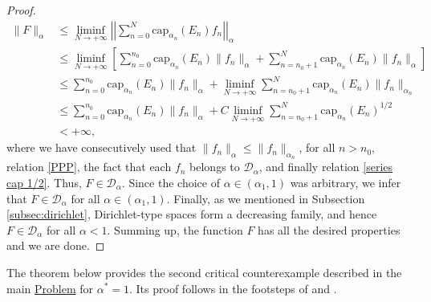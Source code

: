 \documentclass[12pt]{amsart}
\theoremstyle{definition}\newtheorem{remark}[theorem]{Remark}
\theoremstyle{definition}\newtheorem{example}[theorem]{Example}
\theoremstyle{definition}\newtheorem{definition}{Definition}
\numberwithin{equation}{section}
\newcommand\cD{{\mathcal D}}
\begin{document}
\begin{proof}
\begin{align*}
\|F\|_\alpha&\leq\liminf_{N\rightarrow +\infty}\left|\left|\sum_{n=0}^{N}\mathrm{cap}_{\alpha_n}(E_n)f_{n}\right|\right|_\alpha\\
&\leq \liminf_{N\rightarrow +\infty}\left[\sum_{n=0}^{n_0}\mathrm{cap}_{\alpha_n}(E_n)\|f_{n}\|_\alpha +\sum_{n=n_0+1}^{N}\mathrm{cap}_{\alpha_n}(E_n)\|f_{n}\|_\alpha\right]\\
&\leq\sum_{n=0}^{n_0}\mathrm{cap}_{\alpha_n}(E_n)\|f_{n}\|_\alpha +\liminf_{N\rightarrow +\infty}\sum_{n=n_0+1}^{N}\mathrm{cap}_{\alpha_n}(E_n)\|f_{n}\|_{\alpha_n}\\
&\leq\sum_{n=0}^{n_0}\mathrm{cap}_{\alpha_n}(E_n)\|f_{n}\|_\alpha +C\liminf_{N\rightarrow +\infty}\sum_{n=n_0+1}^{N}\mathrm{cap}_{\alpha_n}(E_n)^{1/2}\\
&<+\infty,
\end{align*}
where we have consecutively used that $\|f_n\|_\alpha\le \|f_n\|_{\alpha_n}$, for all $n>n_0$, relation \eqref{PPP}, the fact that each $f_n$ belongs to $\cD_\alpha$, and finally relation \eqref{series cap 1/2}. Thus, $F\in\cD_{\alpha}$. Since the choice of $\alpha\in(\alpha_1,1)$ was arbitrary, we infer that $F\in\cD_\alpha$ for all $\alpha\in(\alpha_1,1)$. Finally, as we mentioned in Subsection \ref{subsec:dirichlet}, Dirichlet-type spaces form a decreasing family, and hence $F\in\cD_\alpha$ for all $\alpha<1$. Summing up, the function $F$ has all the desired properties and we are done.
\end{proof}


The theorem below provides the second critical counterexample described in the main \hyperref[Problem]{Problem} for $\alpha^*=1$. Its proof follows in the footsteps of \cite[Theorem A]{Brown-Cohn} and \cite[Theorem 4.3.2, Theorem 9.2.7]{Primer}. 
\end{document}
